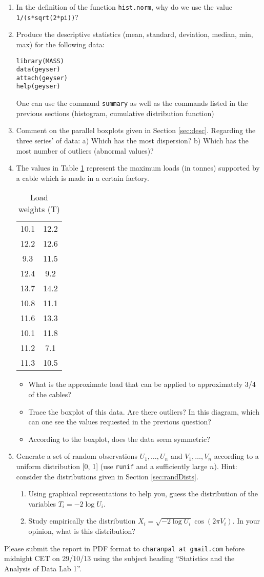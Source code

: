 \documentclass[a4paper,10pt]{article}
\begin{document}
\begin{enumerate} 
\item In the definition of the function \texttt{hist.norm}, why do we use the value \texttt{1/(s*sqrt(2*pi))}?
\item Produce the descriptive statistics (mean, standard, deviation, median, min, max) for the following data: 
\begin{lstlisting} 
library(MASS)
data(geyser)
attach(geyser)
help(geyser)
\end{lstlisting}
One can use the command \texttt{summary} as well as the commands listed in the previous sections (histogram, cumulative distribution function) 
\item Comment on the parallel boxplots given in Section  \ref{sec:desc}. Regarding the three series' of data: a) Which has the most dispersion? b) Which has the most number of outliers (abnormal values)? 
\item The values in Table \ref{tab:loads} represent the maximum loads (in tonnes) supported by a cable which is made in a certain factory. 
\begin{table}[ht]
\begin{center}
\begin{tabular}{c c} 
\hline
10.1 & 12.2\\
12.2 & 12.6\\
9.3 & 11.5\\
12.4 & 9.2\\
13.7 & 14.2\\
10.8 & 11.1\\
11.6 & 13.3\\
10.1 & 11.8 \\
11.2 & 7.1\\
11.3 & 10.5\\
\hline
\end{tabular}
\end{center}
\caption{Load weights (T)}\label{tab:loads}
\end{table}
\begin{itemize}
\item What is the approximate load that can be applied to approximately 3/4 of the cables? 
\item Trace the boxplot of this data. Are there outliers? In this diagram, which can one see the values requested in the previous question? 
\item According to the boxplot, does the data seem symmetric? 
\end{itemize}
\item Generate a set of random observations $U_1 , \ldots , U_n$ and $V_1 ,\ldots , V_n$ according to a uniform distribution [0, 1] (use \texttt{runif} and a sufficiently large $n$). Hint: consider the distributions given in Section \ref{sec:randDists}. 
\begin{enumerate}
\item Using graphical representations to help you, guess the distribution of the variables $T_i = -2 \log U_i$. 
\item Study empirically the distribution $X_i = \sqrt{-2 \log U_i} \cos(2 \pi V_i ).$ In your opinion, what is this distribution? 
\end{enumerate}
\end{enumerate}

Please submit the report in PDF format to \texttt{charanpal at gmail.com} before midnight CET on 29/10/13 using the subject heading ``Statistics and the Analysis of Data Lab 1''. 
\end{document}
